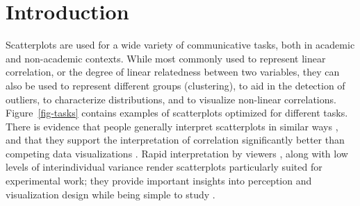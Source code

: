 \documentclass[sigconf]{acmart}
\begin{document}


\maketitle

\setlength{\parskip}{-0.1pt}

\hypertarget{introduction}{%
\section{Introduction}\label{introduction}}

Scatterplots are used for a wide variety of communicative tasks, both in
academic and non-academic contexts. While most commonly used to
represent linear correlation, or the degree of linear relatedness
between two variables, they can also be used to represent different
groups (clustering), to aid in the detection of outliers, to
characterize distributions, and to visualize non-linear correlations.
Figure~\ref{fig-tasks} contains examples of scatterplots optimized for
different tasks. There is evidence that people generally interpret
scatterplots in similar ways \citep{kay_2015}, and that they support the
interpretation of correlation significantly better than competing data
visualizations \citep{li_2010}. Rapid interpretation by viewers
\citep{rensink_2014}, along with low levels of interindividual variance
render scatterplots particularly suited for experimental work; they
provide important insights into perception and visualization design
while being simple to study \citep{rensink_2014}.
\end{document}

